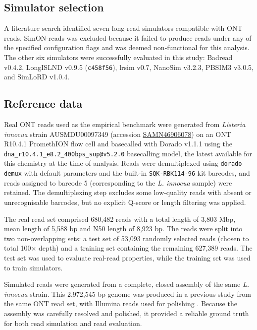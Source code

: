 \documentclass[webpdf,modern,large]{biorxiv}
\begin{document}
\subsection{Simulator selection}
A literature search identified seven long‑read simulators compatible with ONT reads. SimON‑reads\cite{simonreads} was excluded because it failed to produce reads under any of the specified configuration flags and was deemed non‑functional for this analysis. The other six simulators were successfully evaluated in this study: Badread v0.4.2\cite{wick2019badread}, LongISLND v0.9.5 (\texttt{c458f56})\cite{lau2016longislnd}, lrsim v0.7\cite{lrsim}, NanoSim v3.2.3\cite{yang2017nanosim}, PBSIM3 v3.0.5\cite{ono2022pbsim3}, and SimLoRD v1.0.4\cite{stocker2016simlord}.


\subsection{Reference data}
Real ONT reads used as the empirical benchmark were generated from \textit{Listeria innocua} strain AUSMDU00097349 (accession \href{https://www.ncbi.nlm.nih.gov/biosample/SAMN46906078}{SAMN46906078}) on an ONT R10.4.1 PromethION flow cell and basecalled with Dorado v1.1.1\cite{dorado} using the \texttt{dna\_r10.4.1\_e8.2\_400bps\_sup@v5.2.0} basecalling model, the latest available for this chemistry at the time of analysis. Reads were demultiplexed using \texttt{dorado demux} with default parameters and the built-in \texttt{SQK-RBK114-96} kit barcodes, and reads assigned to barcode 5 (corresponding to the \textit{L. innocua} sample) were retained. The demultiplexing step excludes some low-quality reads with absent or unrecognisable barcodes, but no explicit Q-score or length filtering was applied.

The real read set comprised 680,482 reads with a total length of 3,803 Mbp, mean length of 5,588 bp and N50 length of 8,923 bp. The reads were split into two non-overlapping sets: a test set of 53,093 randomly selected reads (chosen to total 100$\times$ depth) and a training set containing the remaining 627,389 reads. The test set was used to evaluate real-read properties, while the training set was used to train simulators.

Simulated reads were generated from a complete, closed assembly of the same \textit{L. innocua} strain. This 2,972,545 bp genome was produced in a previous study from the same ONT read set, with Illumina reads used for polishing \cite{wick2025autocycler}. Because the assembly was carefully resolved and polished, it provided a reliable ground truth for both read simulation and read evaluation.
\end{document}
